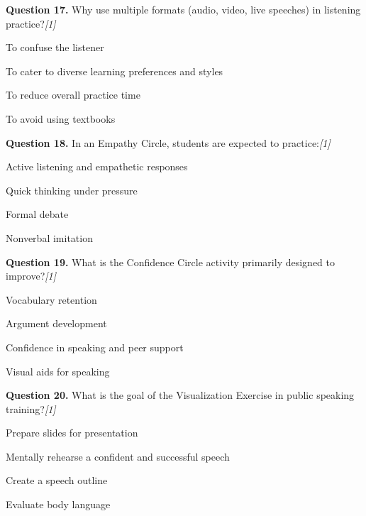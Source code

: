 \documentclass[11pt,a4paper]{article}
\newcommand{\pts}[1]{\hfill   \textit{[#1]}}
\begin{document}
\medskip


\noindent   \textbf{Question 17.} Why use multiple formats (audio, video, live speeches) in listening practice?\pts{1}

\begin{parts}
  \item To confuse the listener
  \item To cater to diverse learning preferences and styles
  \item To reduce overall practice time
  \item To avoid using textbooks
\end{parts}

\medskip


\noindent   \textbf{Question 18.} In an Empathy Circle, students are expected to practice:\pts{1}

\begin{parts}
  \item Active listening and empathetic responses
  \item Quick thinking under pressure
  \item Formal debate
  \item Nonverbal imitation
\end{parts}

\medskip


\noindent   \textbf{Question 19.} What is the Confidence Circle activity primarily designed to improve?\pts{1}

\begin{parts}
  \item Vocabulary retention
  \item Argument development
  \item Confidence in speaking and peer support
  \item Visual aids for speaking
\end{parts}

\medskip


\noindent   \textbf{Question 20.} What is the goal of the Visualization Exercise in public speaking training?\pts{1}

\begin{parts}
  \item Prepare slides for presentation
  \item Mentally rehearse a confident and successful speech
  \item Create a speech outline
  \item Evaluate body language
\end{parts}
\end{document}
